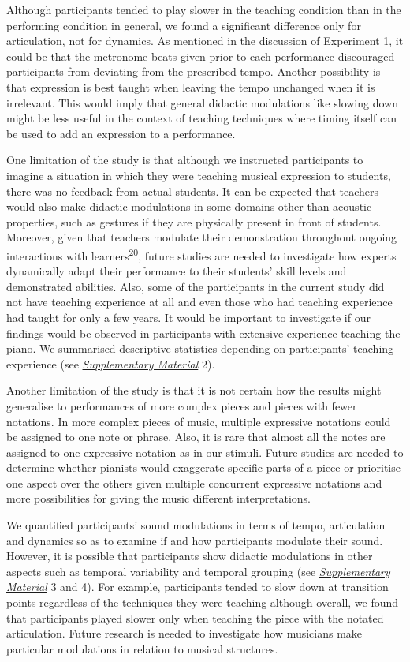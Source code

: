 \documentclass[
  man,floatsintext]{apa6}
\begin{document}
Although participants tended to play slower in the teaching condition than in the performing condition in general, we found a significant difference only for articulation, not for dynamics. As mentioned in the discussion of Experiment 1, it could be that the metronome beats given prior to each performance discouraged participants from deviating from the prescribed tempo. Another possibility is that expression is best taught when leaving the tempo unchanged when it is irrelevant. This would imply that general didactic modulations like slowing down might be less useful in the context of teaching techniques where timing itself can be used to add an expression to a performance.

One limitation of the study is that although we instructed participants to imagine a situation in which they were teaching musical expression to students, there was no feedback from actual students. It can be expected that teachers would also make didactic modulations in some domains other than acoustic properties, such as gestures if they are physically present in front of students. Moreover, given that teachers modulate their demonstration throughout ongoing interactions with learners\textsuperscript{20}, future studies are needed to investigate how experts dynamically adapt their performance to their students' skill levels and demonstrated abilities. Also, some of the participants in the current study did not have teaching experience at all and even those who had teaching experience had taught for only a few years. It would be important to investigate if our findings would be observed in participants with extensive experience teaching the piano. We summarised descriptive statistics depending on participants' teaching experience (see \emph{\protect\hyperlink{supplementary}{Supplementary Material}} 2).

Another limitation of the study is that it is not certain how the results might generalise to performances of more complex pieces and pieces with fewer notations. In more complex pieces of music, multiple expressive notations could be assigned to one note or phrase. Also, it is rare that almost all the notes are assigned to one expressive notation as in our stimuli. Future studies are needed to determine whether pianists would exaggerate specific parts of a piece or prioritise one aspect over the others given multiple concurrent expressive notations and more possibilities for giving the music different interpretations.

We quantified participants' sound modulations in terms of tempo, articulation and dynamics so as to examine if and how participants modulate their sound. However, it is possible that participants show didactic modulations in other aspects such as temporal variability and temporal grouping (see \emph{\protect\hyperlink{supplementary}{Supplementary Material}} 3 and 4). For example, participants tended to slow down at transition points regardless of the techniques they were teaching although overall, we found that participants played slower only when teaching the piece with the notated articulation. Future research is needed to investigate how musicians make particular modulations in relation to musical structures.
\end{document}
